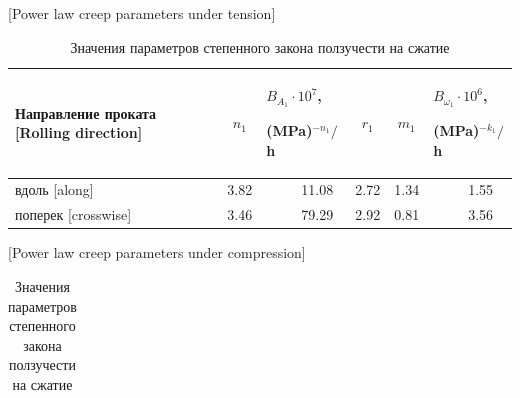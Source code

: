 \begin{table}[t!]



\small \centering



\caption{Значения параметров степенного закона ползучести на растяжение\label{un:tabl} }\vspace{-3mm}

[Power law  creep parameters under tension] 

\renewcommand{\tabcolsep}{0.35cm}

\begin{tabular}{p{3.4cm}|c|p{1.8cm}|c|c|p{1.8cm}} \hline



{\footnotesize Направление проката [Rolling direction] }  & \rule{0mm}{12pt} {\footnotesize $n_1$ }  & {\footnotesize  $B_{A_{1}} \cdot 10^{7}$, \par (MPa)$^{-n_1}/$h} & \footnotesize $r_1$& $m_1$& {\footnotesize $B_{\omega_{1}} \cdot 10^{6}$, \par (MPa)$^{-k_1}/$h}\\

            \hline

            \rule{0mm}{12pt}%

           вдоль [along]      &  3.82 &  ~~~~~11.08  &2.72  & 1.34& ~~~~~1.55  \\

           поперек [crosswise]&  3.46 &  ~~~~~79.29  &2.92  & 0.81& ~~~~~3.56 \\

        

        

            \hline

        \end{tabular}



\vspace{2mm}



\small \centering

\caption{Значения параметров степенного закона ползучести  на сжатие\label{un:tabl2} }\vspace{-3mm}

[Power law  creep parameters under compression] 

\renewcommand{\tabcolsep}{0.3cm}

\begin{tabular}{p{3.4cm}|c|p{1.8cm}|c|c|p{1.8cm}} \hline




\end{tabular}
\end{table}
